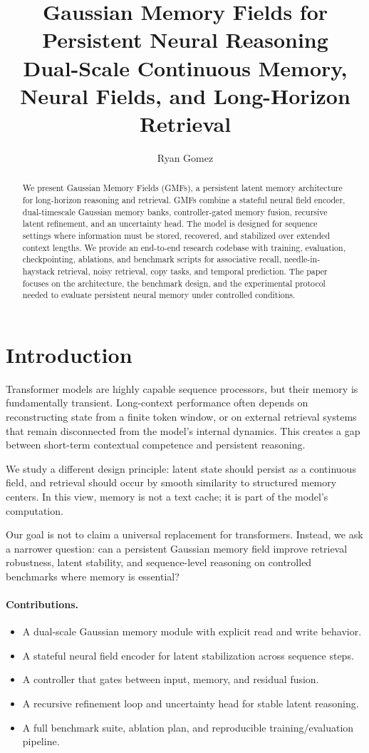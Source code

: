 \documentclass{article}
\title{Gaussian Memory Fields for Persistent Neural Reasoning\\
\large Dual-Scale Continuous Memory, Neural Fields, and Long-Horizon Retrieval}
\author{Ryan Gomez}
\begin{document}
\maketitle

\begin{abstract}
We present Gaussian Memory Fields (GMFs), a persistent latent memory architecture for long-horizon reasoning and retrieval. GMFs combine a stateful neural field encoder, dual-timescale Gaussian memory banks, controller-gated memory fusion, recursive latent refinement, and an uncertainty head. The model is designed for sequence settings where information must be stored, recovered, and stabilized over extended context lengths. We provide an end-to-end research codebase with training, evaluation, checkpointing, ablations, and benchmark scripts for associative recall, needle-in-haystack retrieval, noisy retrieval, copy tasks, and temporal prediction. The paper focuses on the architecture, the benchmark design, and the experimental protocol needed to evaluate persistent neural memory under controlled conditions.
\end{abstract}

\section{Introduction}
Transformer models are highly capable sequence processors, but their memory is fundamentally transient. Long-context performance often depends on reconstructing state from a finite token window, or on external retrieval systems that remain disconnected from the model's internal dynamics. This creates a gap between short-term contextual competence and persistent reasoning.

We study a different design principle: latent state should persist as a continuous field, and retrieval should occur by smooth similarity to structured memory centers. In this view, memory is not a text cache; it is part of the model's computation.

Our goal is not to claim a universal replacement for transformers. Instead, we ask a narrower question: can a persistent Gaussian memory field improve retrieval robustness, latent stability, and sequence-level reasoning on controlled benchmarks where memory is essential?

\paragraph{Contributions.}
\begin{itemize}[leftmargin=*]
\item A dual-scale Gaussian memory module with explicit read and write behavior.
\item A stateful neural field encoder for latent stabilization across sequence steps.
\item A controller that gates between input, memory, and residual fusion.
\item A recursive refinement loop and uncertainty head for stable latent reasoning.
\item A full benchmark suite, ablation plan, and reproducible training/evaluation pipeline.
\end{itemize}
\end{document}
